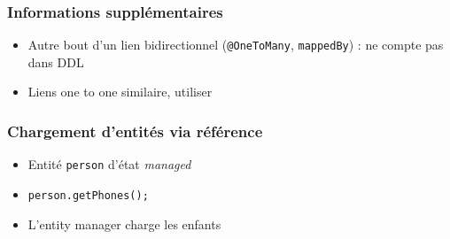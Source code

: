 \documentclass[english, french]{beamer}
\begin{document}
\begin{frame}
	\frametitle{Informations supplémentaires}
	\begin{itemize}
		\item Autre bout d’un lien bidirectionnel (\texttt{@OneToMany}, \texttt{mappedBy}) : ne compte pas dans DDL
		\item Liens one to one similaire, utiliser 
	\end{itemize}
\end{frame}

\begin{frame}
	\frametitle{Chargement d’entités via référence}
	\begin{itemize}
		\item Entité \texttt{person} d’état \emph{managed}
		\item \texttt{person.getPhones();}
		\item L’entity manager charge les enfants
	\end{itemize}
\end{frame}
\end{document}
